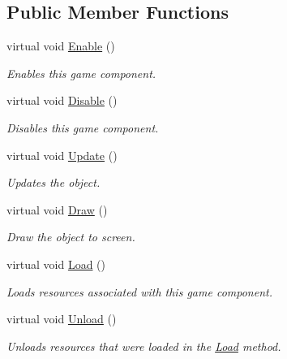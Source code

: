 \subsection*{Public Member Functions}
\begin{DoxyCompactItemize}
\item 
virtual void \hyperlink{class_tri_devs_1_1_tri_engine2_d_1_1_state_management_1_1_game_state_a4ac1b81901a490b43714433361cca771}{Enable} ()
\begin{DoxyCompactList}\small\item\em Enables this game component. \end{DoxyCompactList}\item 
virtual void \hyperlink{class_tri_devs_1_1_tri_engine2_d_1_1_state_management_1_1_game_state_aa9711675b30e13851131f8734070d775}{Disable} ()
\begin{DoxyCompactList}\small\item\em Disables this game component. \end{DoxyCompactList}\item 
virtual void \hyperlink{class_tri_devs_1_1_tri_engine2_d_1_1_state_management_1_1_game_state_a98663c5a2d77ebee9ed0f1dd91f6509a}{Update} ()
\begin{DoxyCompactList}\small\item\em Updates the object. \end{DoxyCompactList}\item 
virtual void \hyperlink{class_tri_devs_1_1_tri_engine2_d_1_1_state_management_1_1_game_state_a53a4361f96b0a795f4bb20a5ae5cf954}{Draw} ()
\begin{DoxyCompactList}\small\item\em Draw the object to screen. \end{DoxyCompactList}\item 
virtual void \hyperlink{class_tri_devs_1_1_tri_engine2_d_1_1_state_management_1_1_game_state_af1ab72f80dac8aa3d00d70bbcdbf6d80}{Load} ()
\begin{DoxyCompactList}\small\item\em Loads resources associated with this game component. \end{DoxyCompactList}\item 
virtual void \hyperlink{class_tri_devs_1_1_tri_engine2_d_1_1_state_management_1_1_game_state_a007cc66067e05123773ba472da212f79}{Unload} ()
\begin{DoxyCompactList}\small\item\em Unloads resources that were loaded in the \hyperlink{class_tri_devs_1_1_tri_engine2_d_1_1_state_management_1_1_game_state_af1ab72f80dac8aa3d00d70bbcdbf6d80}{Load} method. \end{DoxyCompactList}\item 

\end{DoxyCompactItemize}
